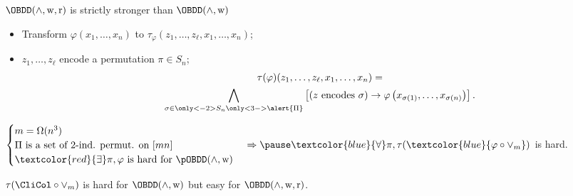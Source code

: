 \begin{frame}{$\OBDD(\land, \weakening, \reordering)$ is strictly stronger than $\OBDD(\land, \weakening)$}

    \pause

    \begin{itemize}
        \item Transform $\varphi(x_1, \dots, x_n)$ to $\tau_{\varphi}(z_1,
            \dots, z_{\ell}, x_1, \dots, x_n)$;
        \item $z_1, \dots, z_{\ell}$ encode a permutation $\pi \in S_n$;
        \begin{multline*}
            \tau(\varphi)(z_1, \dots, z_{\ell}, x_1, \dots, x_n) = \\
            \bigwedge\limits_{\sigma \in \only<-2>{S_n}\only<3->{\alert{\Pi}}}
            \left[\left( z \text{ encodes }
                \sigma \right) \to \varphi\left(x_{\sigma(1)}, \dots, x_{\sigma(n)}\right)
            \right].
        \end{multline*}
    \end{itemize}

    \pause
    \pause


    \begin{theorem}[Segerlind 07]
        $
        \begin{cases}
            m = \Omega(n^3) \\
            \Pi \text{ is a set of 2-ind. permut. on } [mn] \\
            \textcolor{red}{\exists} \pi, \varphi \text{ is hard for } \pOBDD(\land, \weakening)
        \end{cases}
        \Rightarrow \pause \textcolor{blue}{\forall} \pi, \tau(\textcolor{blue}{\varphi \circ \lor_m})$ is hard.
    \end{theorem}

    \pause
    \begin{corollary}
        $\tau(\CliCol \circ \lor_m)$ is hard for $\OBDD(\land, \weakening)$ but easy for
        $\OBDD(\land, \weakening, \reordering)$. 
    \end{corollary}
\end{frame}